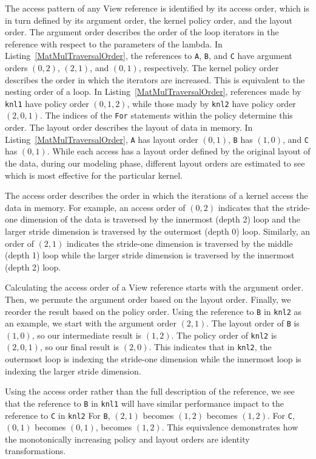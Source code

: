 \documentclass[sigconf]{acmart}
\begin{document}
The access pattern of any View reference is identified by its access order, which is in turn defined by its argument order, the kernel policy order, and the layout order. 
The argument order describes the order of the loop iterators in the reference with respect to the parameters of the lambda. 
In Listing~\ref{MatMulTraversalOrder}, the references to \verb.A., \verb.B., and \verb.C. have argument orders $(0,2)$, $(2,1)$, and $(0,1)$, respectively. 
The kernel policy order describes the order in which the iterators are increased. 
This is equivalent to the nesting order of a loop.
In Listing~\ref{MatMulTraversalOrder}, references made by \verb.knl1. have policy order $(0,1,2)$, while those mady by \verb.knl2. have policy order $(2,0,1)$.
The indices of the \verb.For. statements within the policy determine this order.
The layout order describes the layout of data in memory. 
In Listing~\ref{MatMulTraversalOrder}, \verb.A. has layout order $(0,1)$, \verb.B. has $(1,0)$, and \verb.C. has $(0,1)$.
While each access has a layout order defined by the original layout of the data, during our modeling phase, different layout orders are estimated to see which is most effective for the particular kernel. 

The access order describes the order in which the iterations of a kernel access the data in memory.
For example, an access order of $(0,2)$ indicates that the stride-one dimension of the data is traversed by the innermost (depth 2) loop and the larger stride dimension is traversed by the outermost (depth 0) loop. 
Similarly, an order of $(2,1)$ indicates the stride-one dimension is traversed by the middle (depth 1) loop while the larger stride dimension is traversed by the innermost (depth 2) loop.

Calculating the access order of a View reference starts with the argument order.
Then, we permute the argument order based on the layout order. 
Finally, we reorder the result based on the policy order.
Using the reference to \verb.B. in \verb.knl2. as an example, we start with the argument order $(2,1)$.
The layout order of \verb.B. is $(1,0)$, so our intermediate result is $(1,2)$. 
The policy order of \verb.knl2. is $(2,0,1)$, so our final result is $(2,0)$. 
This indicates that in \verb.knl2., the outermost loop is indexing the stride-one dimension while the innermost loop is indexing the larger stride dimension.

Using the access order rather than the full description of the reference, we see that the reference to \verb.B. in \verb.knl1. will have similar performance impact to the reference to \verb.C. in \verb.knl2.
For \verb.B., $(2,1)$ becomes $(1,2)$ becomes $(1,2)$. 
For \verb.C., $(0,1)$ becomes $(0,1)$, becomes $(1,2)$.
This equivalence demonstrates how the monotonically increasing policy and layout orders are identity transformations.
\end{document}
